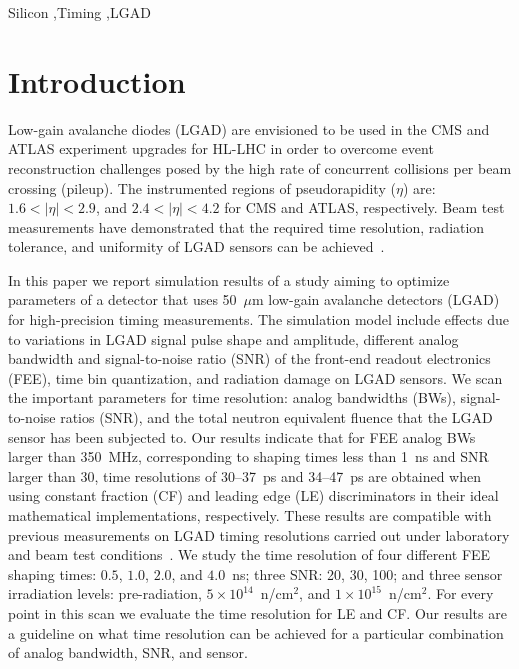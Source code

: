 \documentclass[preprint,1p]{elsarticle}
\begin{document}
\begin{frontmatter}
\begin{keyword}

Silicon \sep Timing \sep LGAD

\end{keyword}

\end{frontmatter}

\tableofcontents


\section{Introduction}

Low-gain avalanche diodes (LGAD) are envisioned to be used in the CMS and ATLAS experiment
upgrades for HL-LHC in order to overcome event reconstruction challenges posed by the high rate of concurrent
collisions per beam crossing (pileup). The instrumented regions of pseudorapidity ($\eta$)
are: $1.6< |\eta| <2.9$, and $2.4< |\eta|<4.2$ for CMS and ATLAS, respectively.
Beam test measurements have demonstrated that the required time resolution,
radiation tolerance, and uniformity of LGAD sensors can be achieved~\cite{Apresyan:2018oln,Allaire_2018}.

In this paper we report simulation results of a study aiming to optimize
parameters of a detector that uses 50~$\mu$m low-gain avalanche detectors (LGAD) for
high-precision timing measurements. The simulation model include effects due to variations
in LGAD signal pulse shape and amplitude, different analog bandwidth and signal-to-noise ratio (SNR) of the front-end readout
electronics (FEE), time bin quantization, and radiation damage on LGAD sensors.
We scan the important parameters for time resolution: analog bandwidths (BWs),
signal-to-noise ratios (SNR), and the total neutron equivalent fluence that the
LGAD sensor has been subjected to. Our results indicate that for FEE analog BWs larger than 350~\si{MHz},
corresponding to shaping times less than 1~\si{ns} and SNR larger than 30, time resolutions of 30--37~\si{ps} and 34--47~\si{ps}
are obtained when using constant fraction (CF) and leading edge (LE) discriminators in their ideal mathematical implementations, respectively.
These results are compatible with previous measurements on LGAD timing resolutions carried out under
laboratory and beam test conditions~\cite{Apresyan:2018oln, Cartiglia201783, PELLEGRINI201412}.
We study the time resolution of four different FEE shaping times: $0.5$, $1.0$,
$2.0$, and $4.0$~\si{ns}; three SNR: 20, 30, 100; and three sensor irradiation
levels: pre-radiation, $5\times 10^{14}$~n/cm$^2$, and $1\times 10^{15}$~n/cm$^2$.
For every point in this scan we evaluate the time resolution for LE and CF.
Our results are a guideline on what time resolution can
be achieved for a particular combination of analog bandwidth, SNR, and sensor.
\end{document}
